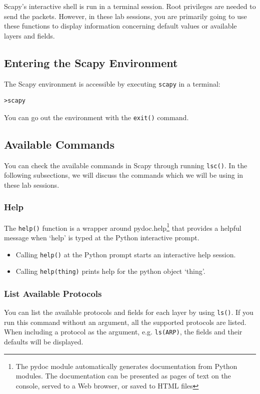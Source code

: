 \documentclass[11pt,a4paper]{article}
\begin{document}
Scapy's interactive shell is run in a terminal session. Root privileges are needed to send the packets. However, in these lab sessions, you are primarily going to use these functions to display information concerning default values or available layers and fields.

\subsection{Entering the Scapy Environment}

The Scapy environment is accessible by executing \texttt{scapy} in a terminal:
%
\begin{lstlisting}
>scapy 
\end{lstlisting}
%
You can go out the environment with the \texttt{exit()} command.

\subsection{Available Commands}
You can check the available commands in Scapy through running \texttt{lsc()}. In the following subsections, we will discuss the commands which we will be using in these lab sessions.

\subsubsection{Help}
The \texttt{help()} function is a wrapper around pydoc.help\footnote{The pydoc module automatically generates documentation from Python modules. The documentation can be presented as pages of text on the console, served to a Web browser, or saved to HTML files} that provides a helpful message when `help' is typed at the Python interactive prompt.

\begin{itemize}
  \item Calling \texttt{help()} at the Python prompt starts an interactive help session.
  \item Calling \texttt{help(thing)} prints help for the python object `thing'.
\end{itemize}

\subsubsection{List Available Protocols}
You can list the available protocols and fields for each layer by using \texttt{ls()}. 
If you run this command without an argument, all the supported protocols are listed.
When including a protocol as the argument, e.g. \texttt{ls(ARP)}, the fields and their defaults will be displayed.

\end{document}
